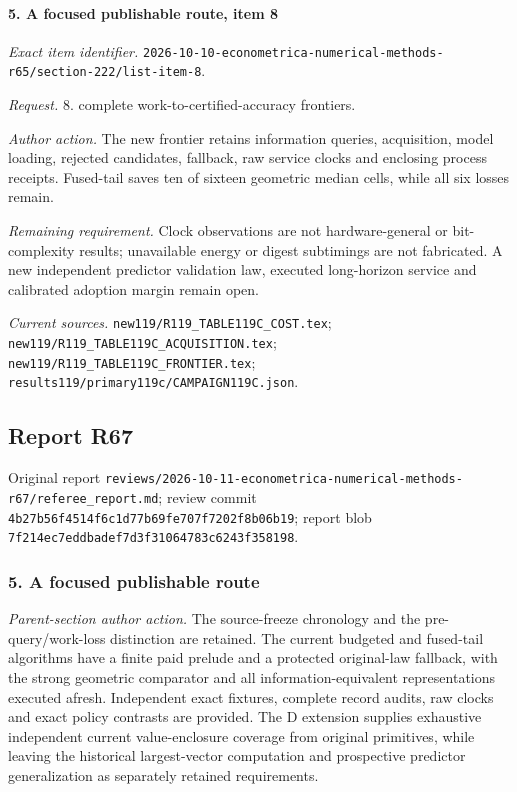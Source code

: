 \paragraph{5. A focused publishable route, item 8}

\emph{Exact item identifier.} \nolinkurl{2026-10-10-econometrica-numerical-methods-r65/section-222/list-item-8}.

\par\emph{Request.} 8. complete work-to-certified-accuracy frontiers.

\par\emph{Author action.} The new frontier retains information queries, acquisition, model loading, rejected candidates, fallback, raw service clocks and enclosing process receipts. Fused-tail saves ten of sixteen geometric median cells, while all six losses remain.

\par\emph{Remaining requirement.} Clock observations are not hardware-general or bit-complexity results; unavailable energy or digest subtimings are not fabricated. A new independent predictor validation law, executed long-horizon service and calibrated adoption margin remain open.

\par\emph{Current sources.} \nolinkurl{new119/R119_TABLE119C_COST.tex}; \nolinkurl{new119/R119_TABLE119C_ACQUISITION.tex}; \nolinkurl{new119/R119_TABLE119C_FRONTIER.tex}; \nolinkurl{results119/primary119c/CAMPAIGN119C.json}.

\subsection{Report R67}

Original report \nolinkurl{reviews/2026-10-11-econometrica-numerical-methods-r67/referee_report.md}; review commit \nolinkurl{4b27b56f4514f6c1d77b69fe707f7202f8b06b19}; report blob \nolinkurl{7f214ec7eddbadef7d3f31064783c6243f358198}.

\subsubsection{5. A focused publishable route}

\emph{Parent-section author action.} The source-freeze chronology and the pre-query/\allowbreak{}work-loss distinction are retained. The current budgeted and fused-tail algorithms have a finite paid prelude and a protected original-law fallback, with the strong geometric comparator and all information-equivalent representations executed afresh. Independent exact fixtures, complete record audits, raw clocks and exact policy contrasts are provided. The D extension supplies exhaustive independent current value-enclosure coverage from original primitives, while leaving the historical largest-vector computation and prospective predictor generalization as separately retained requirements.


